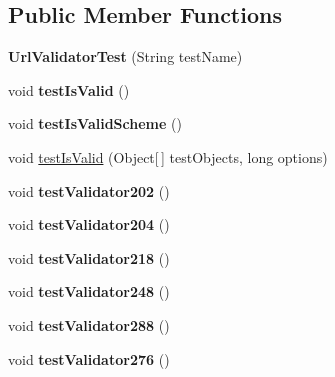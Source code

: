 \subsection*{Public Member Functions}
\begin{DoxyCompactItemize}
\item 
{\bfseries Url\+Validator\+Test} (String test\+Name)\hypertarget{classUrlValidatorTest_a4796e3be2cbb63250e9bf3c6a96c84eb}{}\label{classUrlValidatorTest_a4796e3be2cbb63250e9bf3c6a96c84eb}

\item 
void {\bfseries test\+Is\+Valid} ()\hypertarget{classUrlValidatorTest_a46c190729e25d1f0a4ab52ec51f0397e}{}\label{classUrlValidatorTest_a46c190729e25d1f0a4ab52ec51f0397e}

\item 
void {\bfseries test\+Is\+Valid\+Scheme} ()\hypertarget{classUrlValidatorTest_a1aa4cce51e3c3bcc37150efbec476a1a}{}\label{classUrlValidatorTest_a1aa4cce51e3c3bcc37150efbec476a1a}

\item 
void \hyperlink{classUrlValidatorTest_a81c9df48ab9ffcebda63450df8532b0f}{test\+Is\+Valid} (Object\mbox{[}$\,$\mbox{]} test\+Objects, long options)
\item 
void {\bfseries test\+Validator202} ()\hypertarget{classUrlValidatorTest_a7464e3eb995b62d88cbabf257b03c5db}{}\label{classUrlValidatorTest_a7464e3eb995b62d88cbabf257b03c5db}

\item 
void {\bfseries test\+Validator204} ()\hypertarget{classUrlValidatorTest_a95ff4f8127b26b2ed03b56e3df52b3bf}{}\label{classUrlValidatorTest_a95ff4f8127b26b2ed03b56e3df52b3bf}

\item 
void {\bfseries test\+Validator218} ()\hypertarget{classUrlValidatorTest_af0c55550471d0a9fb57666057558132d}{}\label{classUrlValidatorTest_af0c55550471d0a9fb57666057558132d}

\item 
void {\bfseries test\+Validator248} ()\hypertarget{classUrlValidatorTest_ac5e29fc6d5fabfa5bb98422b931fac44}{}\label{classUrlValidatorTest_ac5e29fc6d5fabfa5bb98422b931fac44}

\item 
void {\bfseries test\+Validator288} ()\hypertarget{classUrlValidatorTest_a34998ec448398cdc30c6293bb328889e}{}\label{classUrlValidatorTest_a34998ec448398cdc30c6293bb328889e}

\item 
void {\bfseries test\+Validator276} ()\hypertarget{classUrlValidatorTest_a233fa1f7edd21b44fed3a6ed441a49a5}{}\label{classUrlValidatorTest_a233fa1f7edd21b44fed3a6ed441a49a5}


\end{DoxyCompactItemize}
